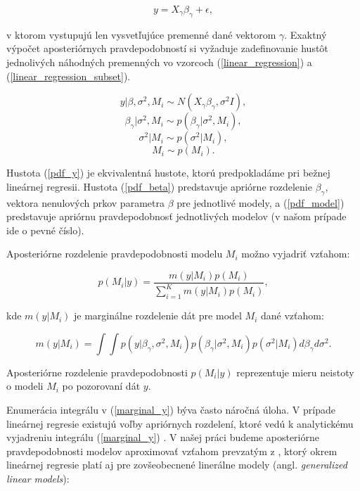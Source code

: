 \begin{equation} \label{linear_regression_subset}
y = X_{\gamma} \beta_{\gamma} + \epsilon,
\end{equation}

v ktorom vystupujú len vysvetľujúce premenné dané vektorom \( \gamma \).
Exaktný výpočet aposteriórnych pravdepodobností si vyžaduje zadefinovanie hustôt jednolivých náhodných premenných vo vzorcoch (\ref{linear_regression}) a (\ref{linear_regression_subset}).

\begin{equation} \label{pdf_y}
    y | \beta, \sigma^2, M_i \sim N(X_{\gamma} \beta_{\gamma}, \sigma^2 I),
\end{equation}
\begin{equation} \label{pdf_beta}
    \beta_{\gamma} | \sigma^2, M_i \sim p(\beta_{\gamma} | \sigma^2, M_i),
\end{equation}
\[
    \sigma^2 | M_i \sim p(\sigma^2 | M_i),
\]
\begin{equation} \label{pdf_model}
    M_i \sim p(M_i).
\end{equation}

Hustota (\ref{pdf_y}) je ekvivalentná hustote, ktorú predpokladáme pri bežnej lineárnej regresii.
Hustota (\ref{pdf_beta}) predstavuje apriórne rozdelenie \( \beta_{\gamma}\), vektora nenulových prkov parametra \(\beta\) pre jednotlivé modely,
a (\ref{pdf_model}) predstavuje apriórnu pravdepodobnosť jednotlivých modelov (v našom prípade ide o pevné číslo).

Aposteriórne rozdelenie pravdepodobnosti modelu \(M_i\) možno vyjadriť vzťahom:

\[
    p(M_i | y) = \frac{m(y | M_i) p(M_i)}{\sum_{i = 1}^{K} m(y | M_i) p(M_i)},
\]

kde \( m(y | M_i) \) je marginálne rozdelenie dát pre model \(M_i\) dané vzťahom:

\begin{equation} \label{marginal_y}
    m(y | M_i) = \int \int p(y | \beta_{\gamma}, \sigma^2, M_i) p(\beta_{\gamma} | \sigma^2, M_i) p(\sigma^2 | M_i) d\beta_{\gamma} d\sigma^2.
\end{equation}

Aposteriórne rozdelenie pravdepodobnosti \( p(M_i | y) \) reprezentuje mieru neistoty o modeli \(M_i\) po pozorovaní dát \(y\).

Enumerácia integrálu v (\ref{marginal_y}) býva často náročná úloha.
V prípade lineárnej regresie existujú voľby apriórnych rozdelení, ktoré vedú k analytickému vyjadreniu integrálu (\ref{marginal_y}) \cite{mcculloch}.
V našej práci budeme aposteriórne pravdepodobnosti modelov aproximovať vzťahom prevzatým z \cite{jamespress},
ktorý okrem lineárnej regresie platí aj pre zovšeobecnené linerálne modely (angl. \emph{generalized linear models}):

